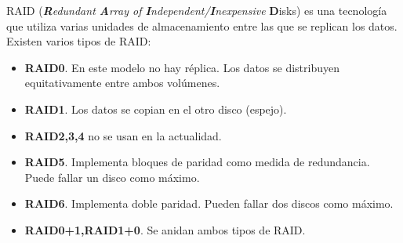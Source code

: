 \documentclass[12pt,spanish]{article}
\begin{document}
RAID (\textit{\textbf{R}edundant \textbf{A}rray of \textbf{I}ndependent/\textbf{I}nexpensive} \textbf{D}isks) es una tecnología que utiliza varias unidades de almacenamiento entre las que se replican los datos. Existen varios tipos de RAID:
\begin{itemize}
  \item \textbf{RAID0}. En este modelo no hay réplica. Los datos se distribuyen equitativamente entre ambos volúmenes.
  \item \textbf{RAID1}. Los datos se copian en el otro disco (espejo).
  \item \textbf{RAID2,3,4} no se usan en la actualidad.
  \item \textbf{RAID5}. Implementa bloques de paridad como medida de redundancia. Puede fallar un disco como máximo.
  \item \textbf{RAID6}. Implementa doble paridad. Pueden fallar dos discos como máximo.
  \item \textbf{RAID0+1,RAID1+0}. Se anidan ambos tipos de RAID.
\end{itemize}
\end{document}
